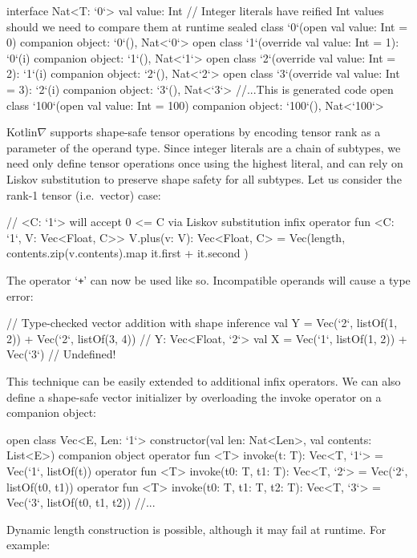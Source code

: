 \documentclass[12pt,initial,twoside,maitrise]{dms}
\numberwithin{equation}{section}
\numberwithin{table}{chapter}
\numberwithin{figure}{chapter}
\begin{document}
%
\begin{mylisting}[caption={Shape safe tensor addition for rank-1 tensors, $\forall C\leq2.$}, language=Kotlin]
interface Nat<T: `0`> { val value: Int }
// Integer literals have reified Int values should we need to compare them at runtime
sealed class `0`(open val value: Int = 0) { companion object: `0`(), Nat<`0`> }
open class `1`(override val value: Int = 1): `0`(i) { companion object: `1`(), Nat<`1`> }
open class `2`(override val value: Int = 2): `1`(i) { companion object: `2`(), Nat<`2`> }
open class `3`(override val value: Int = 3): `2`(i) { companion object: `3`(), Nat<`3`> }
//...This is generated code
open class `100`(open val value: Int = 100) { companion object: `100`(), Nat<`100`> }
\end{mylisting}
%
Kotlin$\nabla$ supports shape-safe tensor operations by encoding tensor rank as a parameter of the operand type. Since integer literals are a chain of subtypes, we need only define tensor operations once using the highest literal, and can rely on Liskov substitution to preserve shape safety for all subtypes. Let us consider the rank-1 tensor (i.e.\ vector) case:
%
\begin{mylisting}
// <C: `1`> will accept 0 <= C via Liskov substitution
infix operator fun <C: `1`, V: Vec<Float, C>> V.plus(v: V): Vec<Float, C> =
    Vec(length, contents.zip(v.contents).map { it.first + it.second })
\end{mylisting}
%
The operator `\texttt{+}' can now be used like so. Incompatible operands will cause a type error:
%
\begin{mylisting}
// Type-checked vector addition with shape inference
val Y = Vec(`2`, listOf(1, 2)) + Vec(`2`, listOf(3, 4)) // Y: Vec<Float, `2`>
val X = Vec(`1`, listOf(1, 2)) + Vec(`3`) // Undefined!
\end{mylisting}
%
This technique can be easily extended to additional infix operators. We can also define a shape-safe vector initializer by overloading the invoke operator on a companion object:
%
\begin{mylisting}
open class Vec<E, Len: `1`> constructor(val len: Nat<Len>, val contents: List<E>) {
  companion object {
    operator fun <T> invoke(t: T): Vec<T, `1`> = Vec(`1`, listOf(t))
    operator fun <T> invoke(t0: T, t1: T): Vec<T, `2`> = Vec(`2`, listOf(t0, t1))
    operator fun <T> invoke(t0: T, t1: T, t2: T): Vec<T, `3`> = Vec(`3`, listOf(t0, t1, t2))
    //...
  }
}
\end{mylisting}
%
Dynamic length construction is possible, although it may fail at runtime. For example:
\end{document}
